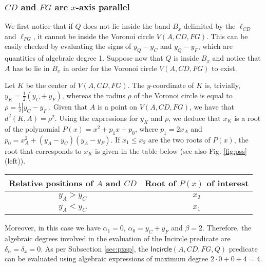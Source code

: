 \documentclass[letterpaper,11pt]{article}
\newcommand{\incircle}{\textsf{Incircle}\xspace}
\newcommand{\vor}{Voronoi\xspace}
\begin{document}
\subsubsection{$CD$ and $FG$ are $x$-axis parallel}\label{sec:pssp-parallel}

We first notice that if $Q$ does not lie inside the band $B_x$
delimited by the $\ell_{CD}$ and $\ell_{FG}$, it cannot be inside the
\vor circle $V(A,CD,FG)$. This can be easily checked by evaluating the
signs of $y_Q-y_C$ and $y_Q-y_F$, which are quantities of algebraic
degree 1. Suppose now that $Q$ is inside $B_x$ and notice that $A$ has
to lie in $B_x$ in order for the \vor circle $V(A,CD,FG)$ to exist. 

Let $K$ be the center of $V(A,CD,FG)$. The $y$-coordinate of $K$ is,
trivially, $y_K=\frac{1}{2}(y_C+y_F)$, whereas the radius $\rho$ of
the \vor circle is equal to $\rho=\frac{1}{2}|y_C-y_F|$. Given that
$A$ is a point on $V(A,CD,FG)$, we have that $d^2(K,A)=\rho^2$. Using
the expressions for $y_K$ and $\rho$, we deduce that $x_K$ is a root
of the polynomial $P(x)=x^2+p_1x+p_0$, where
$p_{1}=2x_A$ and $p_{0}=x_A^{2}+(y_{A}-y_{C})(y_{A}-y_{F})$.
If $x_1\le{}x_2$ are the two roots of $P(x)$, the root that
corresponds to $x_K$ is given in the table below (see also
Fig. \ref{fig:pss}(left)).
\begin{center}
\begin{tabular}{|c|c|}
\hline
Relative positions of $A$ and $CD$ & Root of $ P(x) $ of interest\\
\hline \hline
$y_A>y_C$&$x_{2}$\\\hline
$y_A<y_C$&$x_{1}$\\\hline
\end{tabular}
\end{center}
Moreover, in this case we have $\alpha_1=0$,
$\alpha_0=y_C+y_F$ and $\beta=2$. Therefore, the algebraic degrees
involved in the evaluation of the \incircle predicate are
$\delta_\alpha=\delta_x=0$. As per Subsection \ref{sec:pxsp},
the $\incircle(A,CD,FG,Q)$ predicate can be evaluated using algebraic
expressions of maximum degree $2\cdot{}0+0+4=4$.

\begin{comment}
\begin{table}[ht]
\begin{center}
\begin{tabular}{|c|c|}
\hline
Relative positions of $A$ and $CD$ & Root of $ P(x) $ of interest\\
\hline \hline
$y_A>y_C$&$x_{2}$\\\hline
$y_A<y_C$&$x_{1}$\\\hline
\end{tabular}
\end{center}
\caption{Root of $P(x)$ that corresponds to $x_K$ as a function of the
  relative positions of $A$ and $CD$; $CD$ is assumed to be $x$-axis
  parallel.}
\label{Table:PSSP}
\end{table}
\end{comment}
\end{document}

